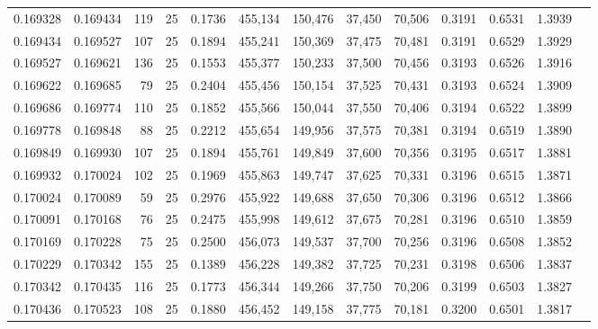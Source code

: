 \begin{tabular}{rrrrrrrrrrrrr}
0.169328 & 0.169434 &   119 &  25 &                                     0.1736 & 455,134 & 150,476 &  37,450 &  70,506 & 0.3191 & 0.6531 & 1.3939 \\
0.169434 & 0.169527 &   107 &  25 &                                     0.1894 & 455,241 & 150,369 &  37,475 &  70,481 & 0.3191 & 0.6529 & 1.3929 \\
0.169527 & 0.169621 &   136 &  25 &                                     0.1553 & 455,377 & 150,233 &  37,500 &  70,456 & 0.3193 & 0.6526 & 1.3916 \\
0.169622 & 0.169685 &    79 &  25 &                                     0.2404 & 455,456 & 150,154 &  37,525 &  70,431 & 0.3193 & 0.6524 & 1.3909 \\
0.169686 & 0.169774 &   110 &  25 &                                     0.1852 & 455,566 & 150,044 &  37,550 &  70,406 & 0.3194 & 0.6522 & 1.3899 \\
0.169778 & 0.169848 &    88 &  25 &                                     0.2212 & 455,654 & 149,956 &  37,575 &  70,381 & 0.3194 & 0.6519 & 1.3890 \\
0.169849 & 0.169930 &   107 &  25 &                                     0.1894 & 455,761 & 149,849 &  37,600 &  70,356 & 0.3195 & 0.6517 & 1.3881 \\
0.169932 & 0.170024 &   102 &  25 &                                     0.1969 & 455,863 & 149,747 &  37,625 &  70,331 & 0.3196 & 0.6515 & 1.3871 \\
0.170024 & 0.170089 &    59 &  25 &                                     0.2976 & 455,922 & 149,688 &  37,650 &  70,306 & 0.3196 & 0.6512 & 1.3866 \\
0.170091 & 0.170168 &    76 &  25 &                                     0.2475 & 455,998 & 149,612 &  37,675 &  70,281 & 0.3196 & 0.6510 & 1.3859 \\
0.170169 & 0.170228 &    75 &  25 &                                     0.2500 & 456,073 & 149,537 &  37,700 &  70,256 & 0.3196 & 0.6508 & 1.3852 \\
0.170229 & 0.170342 &   155 &  25 &                                     0.1389 & 456,228 & 149,382 &  37,725 &  70,231 & 0.3198 & 0.6506 & 1.3837 \\
0.170342 & 0.170435 &   116 &  25 &                                     0.1773 & 456,344 & 149,266 &  37,750 &  70,206 & 0.3199 & 0.6503 & 1.3827 \\
0.170436 & 0.170523 &   108 &  25 &                                     0.1880 & 456,452 & 149,158 &  37,775 &  70,181 & 0.3200 & 0.6501 & 1.3817 \\

\end{tabular}
